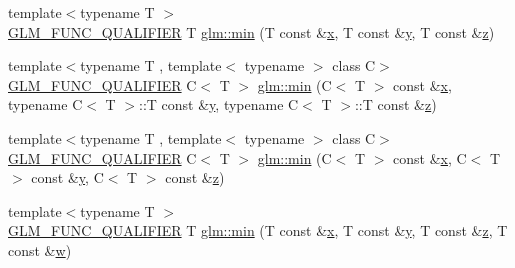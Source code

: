 \begin{DoxyCompactItemize}
\item 
{\footnotesize template$<$typename T $>$ }\\\hyperlink{setup_8hpp_a33fdea6f91c5f834105f7415e2a64407}{G\+L\+M\+\_\+\+F\+U\+N\+C\+\_\+\+Q\+U\+A\+L\+I\+F\+I\+ER} T \hyperlink{group__gtx__extended__min__max_ga713d3f9b3e76312c0d314e0c8611a6a6}{glm\+::min} (T const \&\hyperlink{_s_d_l__opengl_8h_ad0e63d0edcdbd3d79554076bf309fd47}{x}, T const \&\hyperlink{_s_d_l__opengl_8h_a1675d9d7bb68e1657ff028643b4037e3}{y}, T const \&\hyperlink{_s_d_l__opengl__glext_8h_a5e74030ebb3297ce1b37ff716fedd68f}{z})
\item 
{\footnotesize template$<$typename T , template$<$ typename $>$ class C$>$ }\\\hyperlink{setup_8hpp_a33fdea6f91c5f834105f7415e2a64407}{G\+L\+M\+\_\+\+F\+U\+N\+C\+\_\+\+Q\+U\+A\+L\+I\+F\+I\+ER} C$<$ T $>$ \hyperlink{group__gtx__extended__min__max_ga74d1a96e7cdbac40f6d35142d3bcbbd4}{glm\+::min} (C$<$ T $>$ const \&\hyperlink{_s_d_l__opengl_8h_ad0e63d0edcdbd3d79554076bf309fd47}{x}, typename C$<$ T $>$\+::T const \&\hyperlink{_s_d_l__opengl_8h_a1675d9d7bb68e1657ff028643b4037e3}{y}, typename C$<$ T $>$\+::T const \&\hyperlink{_s_d_l__opengl__glext_8h_a5e74030ebb3297ce1b37ff716fedd68f}{z})
\item 
{\footnotesize template$<$typename T , template$<$ typename $>$ class C$>$ }\\\hyperlink{setup_8hpp_a33fdea6f91c5f834105f7415e2a64407}{G\+L\+M\+\_\+\+F\+U\+N\+C\+\_\+\+Q\+U\+A\+L\+I\+F\+I\+ER} C$<$ T $>$ \hyperlink{group__gtx__extended__min__max_ga42b5c3fc027fd3d9a50d2ccc9126d9f0}{glm\+::min} (C$<$ T $>$ const \&\hyperlink{_s_d_l__opengl_8h_ad0e63d0edcdbd3d79554076bf309fd47}{x}, C$<$ T $>$ const \&\hyperlink{_s_d_l__opengl_8h_a1675d9d7bb68e1657ff028643b4037e3}{y}, C$<$ T $>$ const \&\hyperlink{_s_d_l__opengl__glext_8h_a5e74030ebb3297ce1b37ff716fedd68f}{z})
\item 
{\footnotesize template$<$typename T $>$ }\\\hyperlink{setup_8hpp_a33fdea6f91c5f834105f7415e2a64407}{G\+L\+M\+\_\+\+F\+U\+N\+C\+\_\+\+Q\+U\+A\+L\+I\+F\+I\+ER} T \hyperlink{group__gtx__extended__min__max_ga95466987024d03039607f09e69813d69}{glm\+::min} (T const \&\hyperlink{_s_d_l__opengl_8h_ad0e63d0edcdbd3d79554076bf309fd47}{x}, T const \&\hyperlink{_s_d_l__opengl_8h_a1675d9d7bb68e1657ff028643b4037e3}{y}, T const \&\hyperlink{_s_d_l__opengl__glext_8h_a5e74030ebb3297ce1b37ff716fedd68f}{z}, T const \&\hyperlink{_s_d_l__opengl__glext_8h_a6ee8f168a7ab6785a9bb57c6715dad99}{w})

\end{DoxyCompactItemize}
